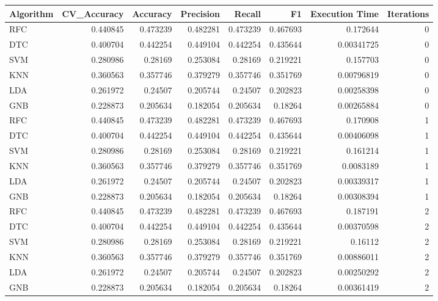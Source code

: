 \documentclass[conference,onecolumn]{IEEEtran}
\begin{document}
    \begin{tabular}{lrrrrrrr}
        \hline
         Algorithm   &   CV\_Accuracy &   Accuracy &   Precision &   Recall &       F1 &   Execution Time &   Iterations \\
        \hline
         RFC         &      0.440845 &   0.473239 &    0.482281 & 0.473239 & 0.467693 &       0.172644   &            0 \\
         DTC         &      0.400704 &   0.442254 &    0.449104 & 0.442254 & 0.435644 &       0.00341725 &            0 \\
         SVM         &      0.280986 &   0.28169  &    0.253084 & 0.28169  & 0.219221 &       0.157703   &            0 \\
         KNN         &      0.360563 &   0.357746 &    0.379279 & 0.357746 & 0.351769 &       0.00796819 &            0 \\
         LDA         &      0.261972 &   0.24507  &    0.205744 & 0.24507  & 0.202823 &       0.00258398 &            0 \\
         GNB         &      0.228873 &   0.205634 &    0.182054 & 0.205634 & 0.18264  &       0.00265884 &            0 \\
         RFC         &      0.440845 &   0.473239 &    0.482281 & 0.473239 & 0.467693 &       0.170908   &            1 \\
         DTC         &      0.400704 &   0.442254 &    0.449104 & 0.442254 & 0.435644 &       0.00406098 &            1 \\
         SVM         &      0.280986 &   0.28169  &    0.253084 & 0.28169  & 0.219221 &       0.161214   &            1 \\
         KNN         &      0.360563 &   0.357746 &    0.379279 & 0.357746 & 0.351769 &       0.0083189  &            1 \\
         LDA         &      0.261972 &   0.24507  &    0.205744 & 0.24507  & 0.202823 &       0.00339317 &            1 \\
         GNB         &      0.228873 &   0.205634 &    0.182054 & 0.205634 & 0.18264  &       0.00308394 &            1 \\
         RFC         &      0.440845 &   0.473239 &    0.482281 & 0.473239 & 0.467693 &       0.187191   &            2 \\
         DTC         &      0.400704 &   0.442254 &    0.449104 & 0.442254 & 0.435644 &       0.00370598 &            2 \\
         SVM         &      0.280986 &   0.28169  &    0.253084 & 0.28169  & 0.219221 &       0.16112    &            2 \\
         KNN         &      0.360563 &   0.357746 &    0.379279 & 0.357746 & 0.351769 &       0.00886011 &            2 \\
         LDA         &      0.261972 &   0.24507  &    0.205744 & 0.24507  & 0.202823 &       0.00250292 &            2 \\
         GNB         &      0.228873 &   0.205634 &    0.182054 & 0.205634 & 0.18264  &       0.00361419 &            2 \\
        \hline
    \end{tabular}
        
\end{document}
